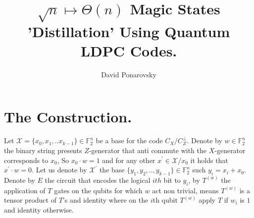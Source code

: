 \documentclass[manuscript,screen,review]{acmart}
\begin{document}

\title{ $\sqrt{n} \mapsto \Theta(n)$  Magic States 'Distillation' Using
Quantum LDPC Codes. }
\author{David Ponarovsky}
\maketitle




\newcommand*{\Mbas}{\mathcal{X}^\prime}

\section{The Construction.} 


Let $\mathcal{X} = \{x_{0}, x_{1}, .. x_{k-1}\} \in \mathbb{F}_{2}^{n}$ be a base for the code $C_{X}/C_{Z}^\perp$.  Denote by $w \in \mathbb{F}_{2}^{n}$ the binary string presents $Z$-generator that anti commute with the $X$-generator corresponds to $x_{0}$, So $x_{0}\cdot w = 1$ and for any other  $x^\prime \in \mathcal{X}/x_{0}$ it holds that $x^{\prime}\cdot w = 0 $. Let us denote by $\Mbas$ the base $\{ y_{1}, y_{2}, .., y_{k-1} \} \in \mathbb{F}_{2}^{n}$ such $y_{i}= x_{i} + x_{0}$. Denote by $E$ the circuit that encodes the logical $ith$ bit to $y_{i}$, by $T^{(w)}$ the application of $T$ gates on the qubits for which $w$ act non trivial, means $T^{(w)}$ is a tensor product of $T$'s and identity where on the $i$th qubit $T^{(w)}$ apply $T$ if $w_{i}$ is $1$ and identity otherwise.








% 



\printbibliography
\end{document}
